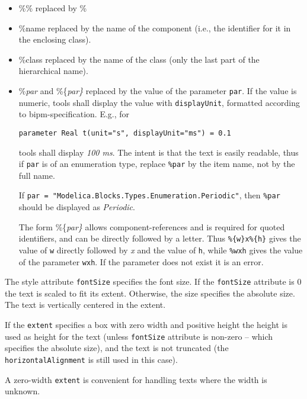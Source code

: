 \begin{itemize}
\item
  \%\% replaced by \%
\item
  \%name replaced by the name of the component (i.e., the identifier for
  it in the enclosing class).
\item
  \%class replaced by the name of the class (only the last part of the hierarchical name).
\item
  \%\emph{par} and \%\{\emph{par\}} replaced by the value of the
  parameter \lstinline!par!.
  If the value is numeric, tools shall display the value with \lstinline!displayUnit!, formatted according to bipm-specification.
  E.g., for
\begin{lstlisting}[language=modelica]
parameter Real t(unit="s", displayUnit="ms") = 0.1
\end{lstlisting}
  tools shall display \emph{100 ms}.
  The intent is that the text is easily readable,
  thus if \lstinline!par! is of an enumeration type, replace \lstinline!%par! by the item name,
  not by the full name.
  \begin{example}
  If \lstinline!par = "Modelica.Blocks.Types.Enumeration.Periodic"!, then \lstinline!%par! should be displayed as \emph{Periodic}.
  \end{example}
  The form \%\{\emph{par\}} allows component-references and is required for quoted identifiers, and can be directly
  followed by a letter. Thus \lstinline!%{w}x%{h}! gives the value of \lstinline!w!
  directly followed by \emph{x} and the value of \lstinline!h!, while \lstinline!%wxh! gives the value of the
  parameter \lstinline!wxh!. If the parameter does not exist it is an error.
\end{itemize}

The style attribute \lstinline!fontSize! specifies the font size. If the \lstinline!fontSize!
attribute is 0 the text is scaled to fit its extent. Otherwise, the size
specifies the absolute size. The text is vertically centered in the extent.

If the \lstinline!extent! specifies a box with zero width and positive height the
height is used as height for the text (unless \lstinline!fontSize! attribute is
non-zero -- which specifies the absolute size), and the text is not
truncated (the \lstinline!horizontalAlignment! is still used in this case).

\begin{nonnormative}
A zero-width \lstinline!extent! is convenient for handling texts where the width is unknown.
\end{nonnormative}

